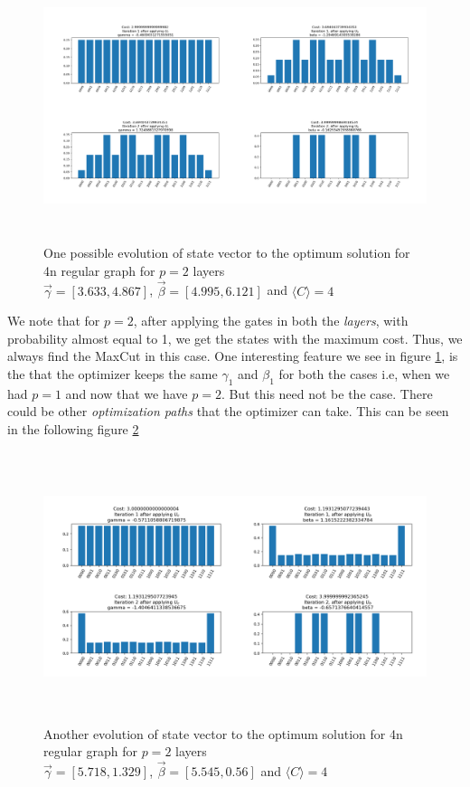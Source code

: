 \begin{figure}[H]
    \centering
    \includegraphics[width= \textwidth,  height= 7.9cm]{Figure_2.png}
    \caption{One possible evolution of state vector to the optimum solution for 4n regular graph for $p = 2$ layers\\
    $\vec{\gamma} = [3.633, 4.867]$, $\vec{\beta} = [4.995, 6.121]$ and $\langle C \rangle = 4$}
    \label{fig:stvc_lbl}
\end{figure}

We note that for $p = 2$, after applying the gates in both the \textit{layers}, with probability almost equal to 1, we get the states with the maximum cost. Thus, we always find the MaxCut in this case.
One interesting feature we see in figure \ref{fig:stvc_lbl}, is the that the optimizer keeps the same $\gamma_1$ and $\beta_1$ for both the cases i.e, when we had $p = 1$ and now that we have $p = 2$.
But this need not be the case. There could be other \textit{optimization paths} that the optimizer can take.
This can be seen in the following figure \ref{fig:my_label}
 
 \begin{figure}[H]
     \centering
     \includegraphics[width= \textwidth, height= 7.9cm]{Figure_1.png}
     \caption{Another evolution of state vector to the optimum solution for 4n regular graph for $p = 2$ layers\\
    $\vec{\gamma} = [5.718, 1.329]$, $\vec{\beta} = [5.545, 0.56]$ and $\langle C \rangle = 4$}
     \label{fig:my_label}
 \end{figure}
 
